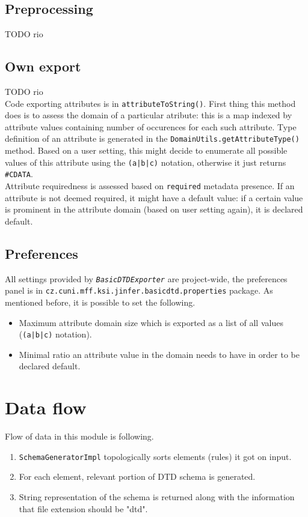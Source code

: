 \documentclass[a4paper,10pt,oneside]{article}
\newcommand{\code}[1]{\texttt{#1}}
\newcommand{\jmodule}[1]{\texttt{\textit{#1}}}
\begin{document}
\subsection{Preprocessing}

TODO rio

\subsection{Own export}

TODO rio\\

Code exporting attributes is in \code{attributeToString()}. First thing this method does is to assess the domain of a particular atribute: this is a map indexed by attribute values containing number of occurences for each such attribute. Type definition of an attribute is generated in the \code{DomainUtils.getAttributeType()} method. Based on a user setting, this might decide to enumerate all possible values of this attribute using the \code{(a|b|c)} notation, otherwise it just returns \code{\#CDATA}.\\
Attribute requiredness is assessed based on \code{required} metadata presence. If an attribute is not deemed required, it might have a default value: if a certain value is prominent in the attribute domain (based on user setting again), it is declared default.

\subsection{Preferences}

All settings provided by \jmodule{BasicDTDExporter} are project-wide, the preferences panel is in \code{cz.cuni.mff.ksi.jinfer.basicdtd.properties} package. As mentioned before, it is possible to set the following. 
\begin{itemize}
	\item Maximum attribute domain size which is exported as a list of all values (\code{(a|b|c)} notation).
	\item Minimal ratio an attribute value in the domain needs to have in order to be declared default.
\end{itemize}

\section{Data flow}

Flow of data in this module is following.
\begin{enumerate}
	\item \code{SchemaGeneratorImpl} topologically sorts elements (rules) it got on input.
	\item For each element, relevant portion of DTD schema is generated.
	\item String representation of the schema is returned along with the information that file extension should be "dtd".
\end{enumerate}

\nocite{*}
\newpage


\end{document}
